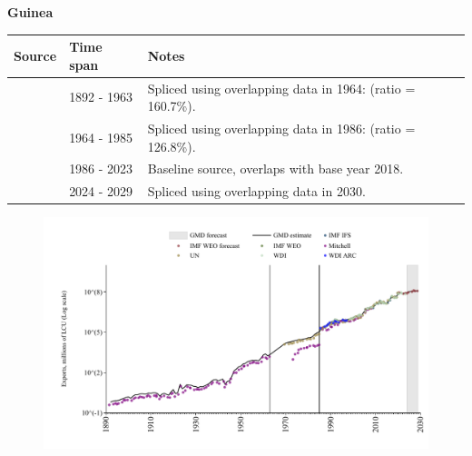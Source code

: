 \documentclass[12pt,a4paper,landscape]{article}
\begin{document}
\begin{adjustbox}{max totalsize={\paperwidth}{\paperheight},center}
\begin{minipage}[t][\textheight][t]{\textwidth}
\vspace*{0.5cm}
{}
\begin{center}
{\Large\bfseries Guinea}
\end{center}
\vspace{0.5cm}
\begin{table}[H]
\centering
\small
\begin{tabular}{|l|l|l|}
\hline
\textbf{Source} & \textbf{Time span} & \textbf{Notes} \\
\hline
\rowcolor{white}\cite{Mitchell}& 1892 - 1963 &Spliced using overlapping data in 1964: (ratio = 160.7\%).\\
\rowcolor{lightgray}\cite{UN}& 1964 - 1985 &Spliced using overlapping data in 1986: (ratio = 126.8\%).\\
\rowcolor{white}\cite{WDI}& 1986 - 2023 &Baseline source, overlaps with base year 2018.\\
\rowcolor{lightgray}\cite{IMF_WEO_forecast}& 2024 - 2029 &Spliced using overlapping data in 2030.\\
\hline
\end{tabular}
\end{table}
\begin{figure}[H]
\centering
\includegraphics[width=\textwidth,height=0.6\textheight,keepaspectratio]{graphs/GIN_exports.pdf}
\end{figure}
\end{minipage}
\end{adjustbox}
\end{document}
